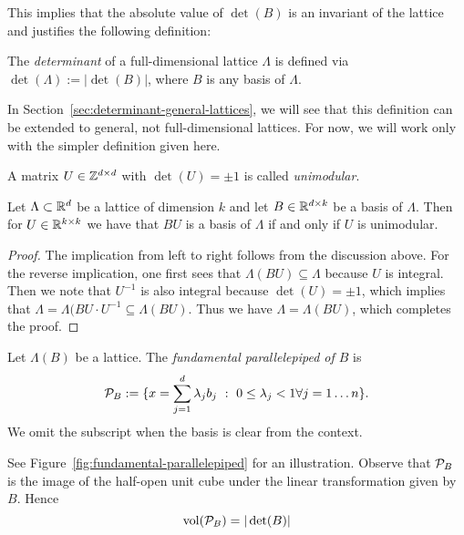 This implies that the absolute value of $\det(B)$ is an invariant of the lattice
and justifies the following definition:
\begin{definition}
  The \emph{determinant} of a full-dimensional lattice $\Lambda$
  is defined via $\det(\Lambda) := |\det(B)|$,
  where $B$ is any basis of $\Lambda$.
\end{definition}

In Section~\ref{sec:determinant-general-lattices},
we will see that this definition can be extended to general, not full-dimensional lattices.
For now, we will work only with the simpler definition given here.

\begin{definition}
  A matrix $U \in \mathbb{Z}^{d \times d}$ with $\det(U) = \pm 1$ is called \emph{unimodular}.
\end{definition}

\begin{lemma}
  \label{lemma:basis-exchange-is-unimodular}
  Let $\Lambda \subset \mathbb{R}^d$ be a lattice of dimension $k$ and let $B \in \mathbb{R}^{d \times k}$ be a basis of $\Lambda$.
  Then for $U \in \mathbb{R}^{k \times k}$ we have that $BU$ is a basis of $\Lambda$ if and only if $U$ is unimodular.
\end{lemma}
\begin{proof}
  The implication from left to right follows from the discussion above.
  For the reverse implication, one first sees that $\Lambda(BU) \subseteq \Lambda$ because $U$ is integral.
  Then we note that $U^{-1}$ is also integral because $\det(U) = \pm 1$,
  which implies that $\Lambda = \Lambda(BU\cdot U^{-1} \subseteq \Lambda(BU)$.
  Thus we have $\Lambda = \Lambda(BU)$, which completes the proof.
\end{proof}




\begin{definition}
  Let $\Lambda(B)$ be a lattice.
  The \emph{fundamental parallelepiped of $B$} is
  \[ \mathcal{P}_B := \{ x = \sum_{j=1}^d \lambda_j b_j ~:~ 0 \leq \lambda_j < 1 \forall j = 1 \ldots n \}. \]
  We omit the subscript when the basis is clear from the context.
\end{definition}
See Figure~\ref{fig:fundamental-parallelepiped} for an illustration.
Observe that $\mathcal{P}_B$ is the image of the half-open unit cube
under the linear transformation given by $B$. Hence
\[ \operatorname{vol}(\mathcal{P}_B) = |\det(B)| \]

